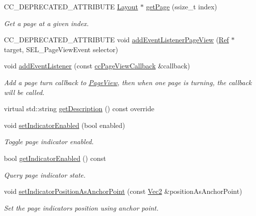 \begin{DoxyCompactItemize}
C\+C\+\_\+\+D\+E\+P\+R\+E\+C\+A\+T\+E\+D\+\_\+\+A\+T\+T\+R\+I\+B\+U\+TE \hyperlink{classui_1_1Layout}{Layout} $\ast$ \hyperlink{classui_1_1PageView_a82ba1073c82a126465158090fad60698}{get\+Page} (ssize\+\_\+t index)
\begin{DoxyCompactList}\small\item\em Get a page at a given index. \end{DoxyCompactList}\item 
C\+C\+\_\+\+D\+E\+P\+R\+E\+C\+A\+T\+E\+D\+\_\+\+A\+T\+T\+R\+I\+B\+U\+TE void \hyperlink{classui_1_1PageView_a557c9a1c9971084fa8ca9be4b19a2f4f}{add\+Event\+Listener\+Page\+View} (\hyperlink{classRef}{Ref} $\ast$target, S\+E\+L\+\_\+\+Page\+View\+Event selector)
\item 
void \hyperlink{classui_1_1PageView_a8887593dc71c203af06f8043082d2de4}{add\+Event\+Listener} (const \hyperlink{classui_1_1PageView_a1cbaf2e41005380574beae96ac2bc136}{cc\+Page\+View\+Callback} \&callback)
\begin{DoxyCompactList}\small\item\em Add a page turn callback to \hyperlink{classui_1_1PageView}{Page\+View}, then when one page is turning, the callback will be called. \end{DoxyCompactList}\item 
virtual std\+::string \hyperlink{classui_1_1PageView_aead0575c0e5d24da3731501afadf81e9}{get\+Description} () const override
\item 
void \hyperlink{classui_1_1PageView_a2fc6399772e0381cd8cfcd3e39aff5f2}{set\+Indicator\+Enabled} (bool enabled)
\begin{DoxyCompactList}\small\item\em Toggle page indicator enabled. \end{DoxyCompactList}\item 
bool \hyperlink{classui_1_1PageView_a15476071cbcf8fc025760426298a2dff}{get\+Indicator\+Enabled} () const
\begin{DoxyCompactList}\small\item\em Query page indicator state. \end{DoxyCompactList}\item 
void \hyperlink{classui_1_1PageView_a72ad43bc3f2aaafc8bfba8244fc9c5bd}{set\+Indicator\+Position\+As\+Anchor\+Point} (const \hyperlink{classVec2}{Vec2} \&position\+As\+Anchor\+Point)
\begin{DoxyCompactList}\small\item\em Set the page indicator\textquotesingle{}s position using anchor point. \end{DoxyCompactList}\item 

\end{DoxyCompactItemize}

